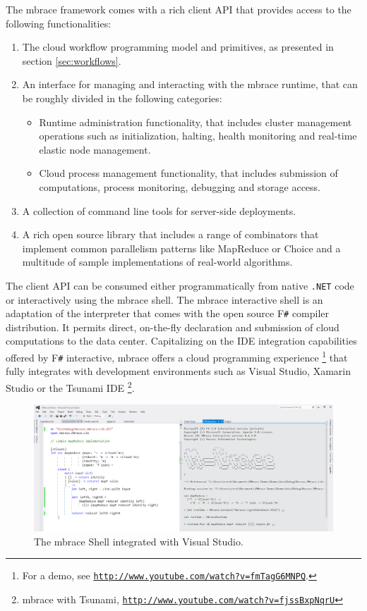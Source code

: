 \documentclass[9pt,a4paper]{article}
\newcommand{\mbrace}{mbrace}
\newcommand{\Mbrace}{\mbrace}
\newcommand{\fsharp}{F\texttt \#}
\newcommand{\dotnet}{\texttt{\hbox{.}NET}}
\newcommand{\samehref}[1]{\href{#1}{\texttt{#1}}}
\begin{document}
The \mbrace{} framework comes with a rich client API that provides access to the 
following functionalities:
\begin{enumerate}
\item The cloud workflow programming model and primitives, as presented in section
\ref{sec:workflows}.
\item An interface for managing and interacting with the \mbrace{} runtime, 
that can be roughly divided in the following categories:
	\begin{itemize}
		\item Runtime administration functionality, that includes cluster management
		operations such as initialization, halting, health monitoring and
		real-time elastic node management.
		\item Cloud process management functionality, that includes submission of
		computations, process monitoring, debugging and storage access.
	\end{itemize}

\item A collection of command line tools for server-side deployments.
\item A rich open source library that includes a range of combinators that
implement common parallelism patterns like MapReduce or Choice and a multitude of 
sample implementations of real-world algorithms.
\end{enumerate}
%
The client API can be consumed either programmatically from native \dotnet{} code
or interactively using the \mbox{\mbrace{}} shell. The \mbrace{} interactive shell is
an adaptation of the interpreter that comes with the open source \fsharp{} compiler
distribution. It permits direct, on-the-fly declaration and submission of cloud 
computations to the data center. Capitalizing on the IDE integration capabilities 
offered by \fsharp{} interactive, \mbrace{} offers a cloud programming experience%
\footnote{For a demo, see \samehref{http://www.youtube.com/watch?v=fmTagG6MNPQ}.}
that fully integrates with development environments such as Visual Studio,
Xamarin Studio or the Tsunami IDE%
\footnote{\mbrace{} with Tsunami, \samehref{http://www.youtube.com/watch?v=fjssBxpNqrU}}.

\begin{figure}[ht]
\label{shellfig}
\centering
\includegraphics[width=\textwidth]{shell.png}
\caption{The \Mbrace{} Shell integrated with Visual Studio.}
\end{figure}
\end{document}

